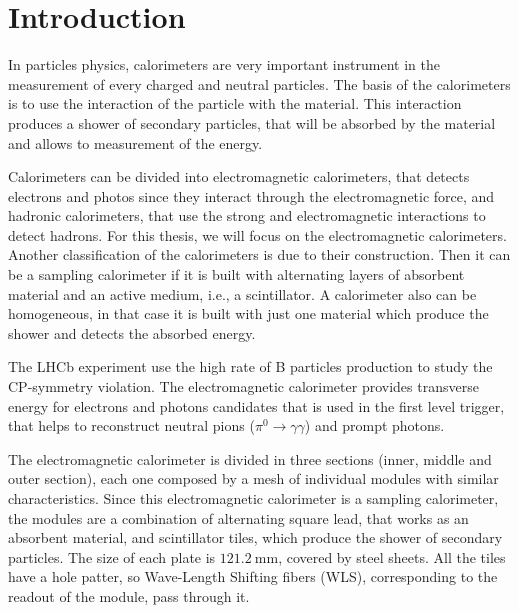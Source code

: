 \chapter{Introduction}
In particles physics, calorimeters are very important instrument in the
measurement of every  charged and neutral particles\cite{zhu2003calorimetry}.
The basis of the calorimeters is to use the interaction of the particle with
the material. This interaction produces a shower of secondary particles, that
will be absorbed by the material and allows to measurement of the
energy\cite{fabjan2003calorimetry}.

Calorimeters can be divided into electromagnetic calorimeters, that detects
electrons and photos since they interact through the electromagnetic force, and
hadronic calorimeters, that use the strong and electromagnetic interactions to
detect hadrons\cite{fabjan2003calorimetry}. For this thesis, we will focus on
the electromagnetic calorimeters. Another classification of the calorimeters is
due to their construction. Then it can be a sampling calorimeter if it is built
with alternating layers of absorbent material and an active medium, i.e., a
scintillator. A calorimeter also can be homogeneous, in that case it is built
with just one material which produce the shower and detects the absorbed
energy\cite{fabjan2003calorimetry}.

The LHCb experiment use the high rate of B particles production to study the
CP-symmetry violation\cite{omelaenko2000lhcb,Collaboration_2008}. The
electromagnetic calorimeter provides transverse energy for electrons and
photons candidates that is used in the first level
trigger\cite{Antunes-Nobrega:630828}, that helps to reconstruct neutral pions
(\(\pi^0 \rightarrow \gamma \gamma\)) and prompt photons.

The electromagnetic calorimeter is divided in three sections (inner, middle and
outer section)\cite{omelaenko2000lhcb}, each one composed by a mesh of
individual modules with similar characteristics. Since this electromagnetic
calorimeter is a sampling calorimeter, the modules are a combination of
alternating square lead, that works as an absorbent
material\cite{omelaenko2000lhcb}, and scintillator tiles, which produce the
shower of secondary particles. The size of each plate is
\(\SI{121.2}{\milli\metre}\), covered by steel sheets. All the tiles have a
hole patter, so Wave-Length Shifting fibers (WLS), corresponding to the readout
of the module, pass through
it\cite{omelaenko2000lhcb,Machikhiliyan_2009,Collaboration_2008}.

